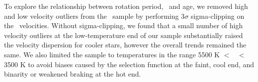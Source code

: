 To explore the relationship between rotation period, \teff\ and age, we
removed high and low velocity outliers from the \mct\ sample by performing
3$\sigma$ sigma-clipping on the \vb\ velocities.
Without sigma-clipping, we found that a small number of high velocity
outliers at the low-temperature end of our sample substantially raised the
velocity dispersion for cooler stars, however the overall trends remained the
same.
We also limited the sample to temperatures in the range 5500 K $<$ \teff\ $<$
3500 K to avoid biases caused by the selection function at the faint, cool
end, and binarity or weakened braking \citep{vansaders2016} at the hot end.

